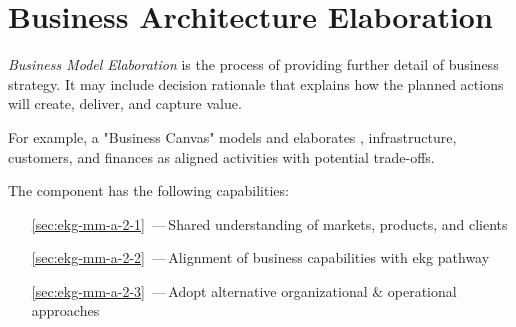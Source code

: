 \chapter{Business Architecture Elaboration}%
\label{ch:ekg-mm-a-2}
\label{ch:ekg-mm-business-architecture-elaboration}

\textit{Business Model Elaboration} is the process of providing further detail of business strategy.
It may include decision rationale that explains how the planned actions will create, deliver, and capture value.

For example, a "Business Canvas" models and elaborates ,
infrastructure, customers, and finances as aligned activities with potential trade-offs.

The  component has the following capabilities:

\begin{itemize}[leftmargin=.5in]
  \item [\ref{sec:ekg-mm-a-2-1}] \,---\,Shared understanding of markets, products, and clients
  \item [\ref{sec:ekg-mm-a-2-2}] \,---\,Alignment of business capabilities with \gls{ekg} pathway
  \item [\ref{sec:ekg-mm-a-2-3}] \,---\,Adopt alternative organizational \& operational approaches
\end{itemize}






